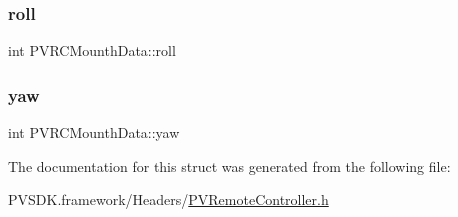 \subsubsection{\texorpdfstring{roll}{roll}}
{\footnotesize\ttfamily int P\+V\+R\+C\+Mounth\+Data\+::roll}

\mbox{\label{struct_p_v_r_c_mounth_data_a87b7fafb05530ea3f927a942bce03ed3}} 
\subsubsection{\texorpdfstring{yaw}{yaw}}
{\footnotesize\ttfamily int P\+V\+R\+C\+Mounth\+Data\+::yaw}



The documentation for this struct was generated from the following file\+:\begin{DoxyCompactItemize}
\item 
P\+V\+S\+D\+K.\+framework/\+Headers/\hyperlink{_p_v_remote_controller_8h}{P\+V\+Remote\+Controller.\+h}\end{DoxyCompactItemize}
